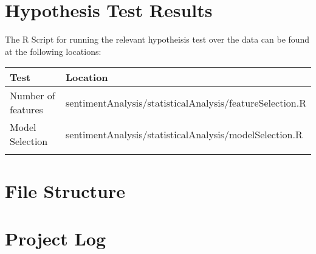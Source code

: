 
\begin{appendices}

\section{Hypothesis Test Results}
\label{appendix:hypothesis}
The R Script for running the relevant hypotheisis test over the data can be found at the following locations:
\begin{center}

\begin{tabular}{|l|l|}
\hline
 Test &  Location\\ \hline
 Number of features &  sentimentAnalysis/statisticalAnalysis/featureSelection.R\\
 Model Selection &  sentimentAnalysis/statisticalAnalysis/modelSelection.R\\
 &  \\ \hline
\end{tabular}
\end{center}

\section{File Structure}

\section{Project Log}

\end{appendices}
